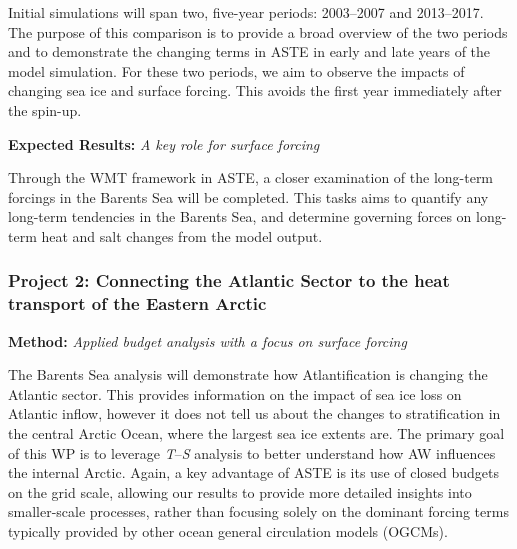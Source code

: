 \documentclass[a4paper,12pt]{article}
\begin{document}
    Initial simulations will span two, five-year periods: 2003--2007 and 2013--2017. The purpose of this comparison is to provide a broad overview of the two periods and to demonstrate the changing terms in ASTE in early and late years of the model simulation. For these two periods, we aim to observe the impacts of changing sea ice and surface forcing. This avoids the first year immediately after the spin-up. 



    \begin{tcolorbox}[minipage,colback=Goldenrod,arc=10pt,outer arc=10pt]
    \centering
    \textbf{Expected Results:}	\emph{A key role for surface forcing}\label{sec1_2}
    \end{tcolorbox}
    Through the WMT framework in ASTE, a closer examination of the long-term forcings in the Barents Sea will be completed. This tasks aims to quantify any long-term tendencies in the Barents Sea, and determine governing forces on long-term heat and salt changes from the model output.


    \subsubsection{Project 2: Connecting the Atlantic Sector to the heat transport of the Eastern Arctic}
    
    \begin{tcolorbox}[minipage,colback=columbiablue,arc=10pt,outer arc=10pt]
    \centering
    \textbf{Method:}	\emph{Applied budget analysis with a focus on surface forcing}\label{sec2_1}
    \end{tcolorbox}
    The Barents Sea analysis will demonstrate how Atlantification is changing the Atlantic sector. This provides information on the impact of sea ice loss on Atlantic inflow, however it does not tell us about the changes to stratification in the central Arctic Ocean, where the largest sea ice extents are. The primary goal of this WP is to leverage \emph{T}--\emph{S} analysis to better understand how AW influences the internal Arctic. Again, a key advantage of ASTE is its use of closed budgets on the grid scale, allowing our results to provide more detailed insights into smaller-scale processes, rather than focusing solely on the dominant forcing terms typically provided by other ocean general circulation models (OGCMs).
\end{document}
